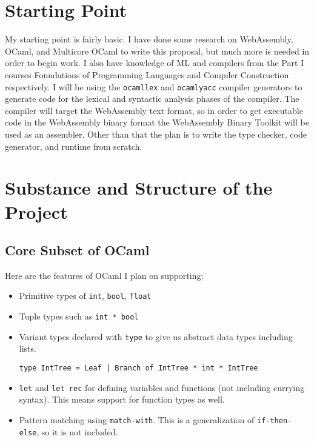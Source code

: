 \documentclass[a4paper,12pt]{article}
\begin{document}
\section{Starting Point}

My starting point is fairly basic.
I have done some research on WebAssembly, OCaml, and Multicore OCaml to write this proposal, but much more is needed in order to begin work.
I also have knowledge of ML and compilers from the Part I courses Foundations of Programming Languages and Compiler Construction respectively.
I will be using the {\tt ocamllex} and {\tt ocamlyacc} compiler generators to generate code for the lexical and syntactic analysis phases of the compiler.
The compiler will target the WebAssembly text format, so in order to get executable code in the WebAssembly binary format the WebAssembly Binary Toolkit will be used as an assembler.
Other than that the plan is to write the type checker, code generator, and runtime from scratch.

\section{Substance and Structure of the Project}

\subsection{Core Subset of OCaml}
Here are the features of OCaml I plan on supporting:
\begin{itemize}
   \item
      Primitive types of {\tt int}, {\tt bool}, {\tt float}
   \item
      Tuple types such as {\tt int * bool}
   \item
      Variant types declared with {\tt type} to give us abstract data types including lists.
      \begin{verbatim}
type IntTree = Leaf | Branch of IntTree * int * IntTree
      \end{verbatim}
   \item
      {\tt let} and {\tt let rec} for defining variables and functions (not including currying syntax).
      This means support for function types as well.
   \item
      Pattern matching using {\tt match-with}.
      This is a generalization of {\tt if-then-else}, so it is not included.

\end{itemize}
\end{document}
